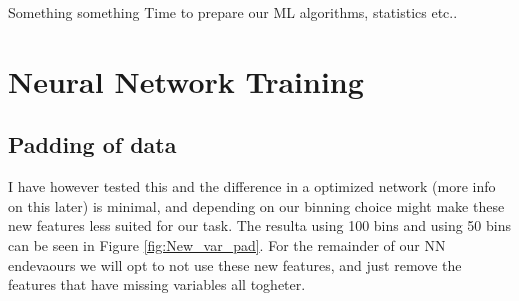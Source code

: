 \documentclass[14pt, a4paper]{book}
\begin{document}
\label{chap:Best_ML}
Something something Time to prepare our ML algorithms, statistics etc..

\section{Neural Network Training}
\subsection{Padding of data}\label{sec:padding_NN_res}
I have however tested this and the difference in a optimized network (more info on this later) is minimal, and depending on our binning choice might make these new features less suited for our task. The resulta using 100 bins and using 50 bins 
can be seen in Figure \ref{fig:New_var_pad}. For the remainder of our NN endevaours we will opt to not use these new features, and just remove the features that have missing variables all togheter.
\graphicspath{{../../../Plots/NeuralNetwork/FULL/padding/}}
\end{document}
